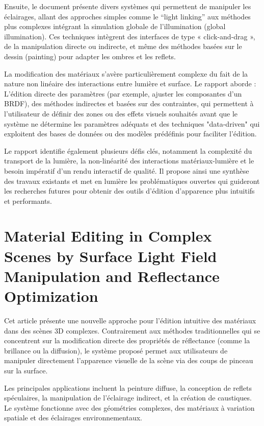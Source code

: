 \documentclass[runningheads]{llncs}
\begin{document}
Ensuite, le document présente divers systèmes qui permettent de manipuler les éclairages, allant des approches simples comme le “light linking” aux 
méthodes plus complexes intégrant la simulation globale de l’illumination (global illumination). Ces techniques intègrent des interfaces 
de type « click-and-drag », de la manipulation directe ou indirecte, et même des méthodes basées sur le dessin (painting) pour adapter les ombres 
et les reflets.

La modification des matériaux s’avère particulièrement complexe du fait de la nature non linéaire des interactions entre lumière et surface. 
Le rapport aborde : L’édition directe des paramètres (par exemple, ajuster les composantes d’un BRDF), des méthodes indirectes et basées sur des 
contraintes, qui permettent à l’utilisateur de définir des zones ou des effets visuels souhaités avant que le système ne détermine les paramètres
adéquats et des techniques "data-driven" qui exploitent des bases de données ou des modèles prédéfinis pour faciliter l’édition.

Le rapport identifie également plusieurs défis clés, notamment la complexité du transport de la lumière, la non-linéarité des interactions 
matériaux-lumière et le besoin impératif d’un rendu interactif de qualité. Il propose ainsi une synthèse des travaux existants et met en lumière
les problématiques ouvertes qui guideront les recherches futures pour obtenir des outils d’édition d’apparence plus intuitifs et performants.

\section{Material Editing in Complex Scenes by Surface Light Field Manipulation and Reflectance Optimization}

Cet article présente une nouvelle approche pour l'édition intuitive des matériaux dans des scènes 3D complexes. Contrairement aux méthodes traditionnelles qui se concentrent sur la modification directe des propriétés de réflectance (comme la brillance ou la diffusion), le système proposé permet aux utilisateurs de manipuler directement l'apparence visuelle de la scène via des coups de pinceau sur la surface.

Les principales applications incluent la peinture diffuse, la conception de reflets spéculaires, la manipulation de l'éclairage indirect, et la création de caustiques. Le système fonctionne avec des géométries complexes, des matériaux à variation spatiale et des éclairages environnementaux.
\end{document}
